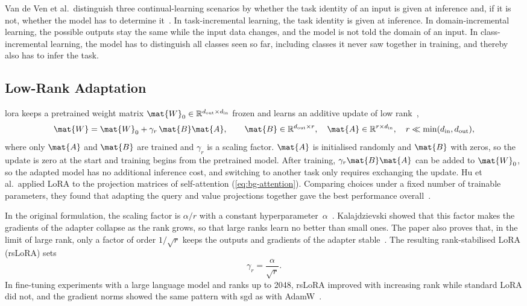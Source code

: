 Van de Ven et al.\ distinguish three continual-learning scenarios by whether the task identity of an input is given at inference and, if it is not, whether the model has to determine it~\cite{van_de_Ven_2025}.
In task-incremental learning, the task identity is given at inference.
In domain-incremental learning, the possible outputs stay the same while the input data changes, and the model is not told the domain of an input.
In class-incremental learning, the model has to distinguish all classes seen so far, including classes it never saw together in training, and thereby also has to infer the task.

\subsection{Low-Rank Adaptation}
\label{subsec:bg-lora}

\Gls{lora} keeps a pretrained weight matrix $\mat{W}_0 \in \mathbb{R}^{d_{\mathrm{out}} \times d_{\mathrm{in}}}$ frozen and learns an additive update of low rank~\cite[Sec.~4.1]{hu2022lora},
\begin{equation}
\mat{W} = \mat{W}_0 + \gamma_r \, \mat{B}\mat{A},
\qquad \mat{B} \in \mathbb{R}^{d_{\mathrm{out}} \times r}, \quad \mat{A} \in \mathbb{R}^{r \times d_{\mathrm{in}}}, \quad r \ll \min(d_{\mathrm{in}}, d_{\mathrm{out}}),
\label{eq:bg-lora}
\end{equation}
where only $\mat{A}$ and $\mat{B}$ are trained and $\gamma_r$ is a scaling factor.
$\mat{A}$ is initialised randomly and $\mat{B}$ with zeros, so the update is zero at the start and training begins from the pretrained model.
After training, $\gamma_r\mat{B}\mat{A}$ can be added to $\mat{W}_0$, so the adapted model has no additional inference cost, and switching to another task only requires exchanging the update.
Hu et al.\ applied LoRA to the projection matrices of self-attention (\cref{eq:bg-attention}).
Comparing choices under a fixed number of trainable parameters, they found that adapting the query and value projections together gave the best performance overall~\cite[Secs.~4.2 and~7.1, Table~5]{hu2022lora}.

In the original formulation, the scaling factor is $\alpha / r$ with a constant hyperparameter~$\alpha$~\cite[Sec.~4.1]{hu2022lora}.
Kalajdzievski showed that this factor makes the gradients of the adapter collapse as the rank grows, so that large ranks learn no better than small ones.
The paper also proves that, in the limit of large rank, only a factor of order $1/\sqrt{r}$ keeps the outputs and gradients of the adapter stable~\cite[Secs.~2.1 and~3]{kalajdzievski2023rankstabilizationscalingfactor}.
The resulting rank-stabilised LoRA (rsLoRA) sets
\begin{equation}
\gamma_r = \frac{\alpha}{\sqrt{r}}.
\label{eq:bg-rslora}
\end{equation}
In fine-tuning experiments with a large language model and ranks up to 2048, rsLoRA improved with increasing rank while standard LoRA did not, and the gradient norms showed the same pattern with \gls{sgd} as with AdamW~\cite[Sec.~4]{kalajdzievski2023rankstabilizationscalingfactor}.

